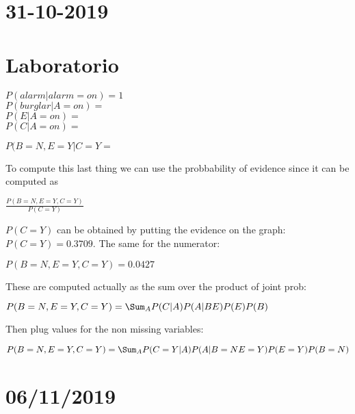 \chapter{31-10-2019}
\chapter{Laboratorio}
\begin{center}
	$\displaystyle P(alarm\vert alarm=on)=1$\\
	$P(burglar\vert A=on)=$\\
	$P(E\vert A=on)=$\\
	$P(C\vert A=on)=$
\end{center}
\begin{center}
	$\displaystyle P(B=N,E=Y\vert C=Y=$
\end{center}
To compute this last thing we can use the probbability of evidence since it can be computed as 
\begin{center}
	$\displaystyle \frac{P(B=N, E=Y,C=Y)}{P(C=Y)}$
\end{center}
$P(C=Y)$ can be obtained by putting the evidence on the graph: $P(C=Y)=0.3709$. The same for the numerator:
\begin{center}
	$\displaystyle P(B=N, E=Y,C=Y)=0.0427$
\end{center}
These are computed actually as the sum over the product of joint prob:
\begin{center}
	$\displaystyle P(B=N, E=Y,C=Y)=\Sum_A P(C\vert A)P(A\vert B E)P(E)P(B)$
\end{center}
Then plug values for the non missing variables:
\begin{center}
	$\displaystyle P(B=N, E=Y,C=Y)=\Sum_A P(C=Y\vert A)P(A\vert B=N E=Y)P(E=Y)P(B=N)$
\end{center}

\chapter{06/11/2019}
